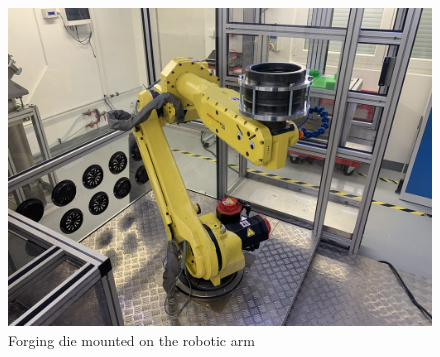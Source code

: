 \begin{figure}[h]
    \centering
    \includegraphics[width=1.0\linewidth]{img/cast.jpeg}
    \caption{Forging die mounted on the robotic arm}
    \label{fig:cast}
\end{figure}



